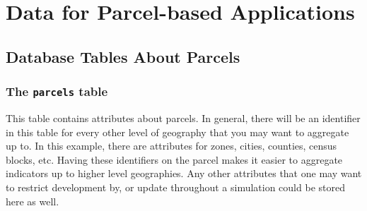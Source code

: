 \chapter{Data for Parcel-based Applications}

\section{Database Tables About Parcels}

\subsection{The {\tt parcels} table}
\label{sec:db-tables-parcels}

This table contains attributes about parcels.  In general, there will be an identifier in this table for every other level of geography that you may want to aggregate up to.  In this example, there are attributes for zones, cities, counties, census blocks, etc.  Having these identifiers on the parcel makes it easier to aggregate indicators up to higher level geographies.  Any other attributes that one may want to restrict development by, or update throughout a simulation could be stored here as well.


